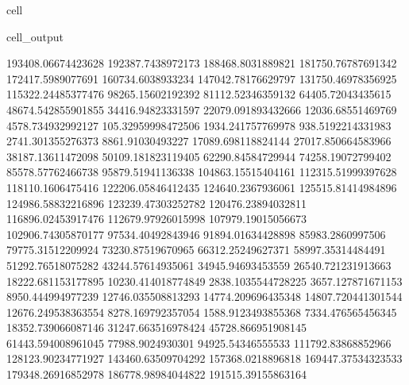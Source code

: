 \documentclass[letterpaper,10pt,english]{jupyterBook}
\begin{document}
\begin{sphinxuseclass}{cell}
\begin{sphinxVerbatimOutput}
\begin{sphinxuseclass}{cell_output}
\begin{sphinxVerbatim}[commandchars=\\\{\}]
193408.06674423628  192387.7438972173  188468.8031889821  181750.76787691342  172417.5989077691  160734.6038933234  147042.78176629797  131750.46978356925  115322.24485377476  98265.15602192392  81112.52346359132  64405.72043435615  48674.542855901855  34416.94823331597  22079.091893432666  12036.68551469769  4578.734932992127  \PYGZhy{}105.32959998472506  \PYGZhy{}1934.241757769978  \PYGZhy{}938.5192214331983  2741.301355276373  8861.91030493227  17089.698118824144  27017.850664583966  38187.13611472098  50109.181823119405  62290.84584729944  74258.19072799402  85578.57762466738  95879.51941136338  104863.15515404161  112315.51999397628  118110.1606475416  122206.05846412435  124640.2367936061  125515.81414984896  124986.58832216896  123239.47303252782  120476.23894032811  116896.02453917476  112679.97926015998  107979.19015056673  102906.74305870177  97534.40492843946  91894.01634428898  85983.2860997506  79775.31512209924  73230.87519670965  66312.25249627371  58997.35314484491  51292.76518075282  43244.57614935061  34945.94693453559  26540.721231913663  18222.681153177895  10230.414018774849  2838.1035544728225  \PYGZhy{}3657.127871671153  \PYGZhy{}8950.444994977239  \PYGZhy{}12746.035508813293  \PYGZhy{}14774.209696435348  \PYGZhy{}14807.720441301544  \PYGZhy{}12676.249538363554  \PYGZhy{}8278.169792357054  \PYGZhy{}1588.9123493855368  7334.476565456345  18352.739066087146  31247.663516978424  45728.866951908145  61443.594008961045  77988.9024930301  94925.54346555533  111792.83868852966  128123.90234771927  143460.63509704292  157368.0218896818  169447.37534323533  179348.26916852978  186778.98984044822  191515.39155863164  

\end{sphinxVerbatim}
\end{sphinxuseclass}
\end{sphinxVerbatimOutput}
\end{sphinxuseclass}
\end{document}
